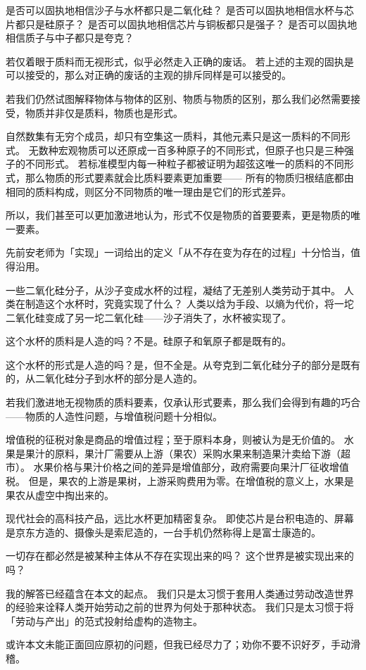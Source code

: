 \documentclass[a4paper,11pt]{article}
\begin{document}
是否可以固执地相信沙子与水杯都只是二氧化硅？
是否可以固执地相信水杯与芯片都只是硅原子？
是否可以固执地相信芯片与铜板都只是强子？
是否可以固执地相信质子与中子都只是夸克？

若仅着眼于质料而无视形式，似乎必然走入正确的废话。
若上述的主观的固执是可以接受的，那么对正确的废话的主观的排斥同样是可以接受的。

若我们仍然试图解释物体与物体的区别、物质与物质的区别，那么我们必然需要接受，物质并非仅是质料，物质也是形式。

自然数集有无穷个成员，却只有空集这一质料，其他元素只是这一质料的不同形式。
无数种宏观物质可以还原成一百多种原子的不同形式，但原子也只是三种强子的不同形式。
若标准模型内每一种粒子都被证明为超弦这唯一的质料的不同形式，那么物质的形式要素就会比质料要素更加重要——
所有的物质归根结底都由相同的质料构成，则区分不同物质的唯一理由是它们的形式差异。

所以，我们甚至可以更加激进地认为，形式不仅是物质的首要要素，更是物质的唯一要素。








先前安老师为「实现」一词给出的定义「从不存在变为存在的过程」十分恰当，值得沿用。

一些二氧化硅分子，从沙子变成水杯的过程，凝结了无差别人类劳动于其中。
人类在制造这个水杯时，究竟实现了什么？
人类以焓为手段、以熵为代价，将一坨二氧化硅变成了另一坨二氧化硅——沙子消失了，水杯被实现了。

这个水杯的质料是人造的吗？不是。硅原子和氧原子都是既有的。

这个水杯的形式是人造的吗？是，但不全是。从夸克到二氧化硅分子的部分是既有的，从二氧化硅分子到水杯的部分是人造的。

若我们激进地无视物质的质料要素，仅承认形式要素，那么我们会得到有趣的巧合——物质的人造性问题，与增值税问题十分相似。

增值税的征税对象是商品的增值过程；至于原料本身，则被认为是无价值的。
水果是果汁的原料，果汁厂需要从上游（果农）采购水果来制造果汁卖给下游（超市）。
水果价格与果汁价格之间的差异是增值部分，政府需要向果汁厂征收增值税。
但是，果农的上游是果树，上游采购费用为零。在增值税的意义上，水果是果农从虚空中掏出来的。

现代社会的高科技产品，远比水杯更加精密复杂。
即使芯片是台积电造的、屏幕是京东方造的、摄像头是索尼造的，一台手机仍然称得上是富士康造的。









一切存在都必然是被某种主体从不存在实现出来的吗？
这个世界是被实现出来的吗？

我的解答已经蕴含在本文的起点。
我们只是太习惯于套用人类通过劳动改造世界的经验来诠释人类开始劳动之前的世界为何处于那种状态。
我们只是太习惯于将「劳动与产出」的范式投射给虚构的造物主。

或许本文未能正面回应原初的问题，但我已经尽力了；劝你不要不识好歹，手动滑稽。












\end{document}
